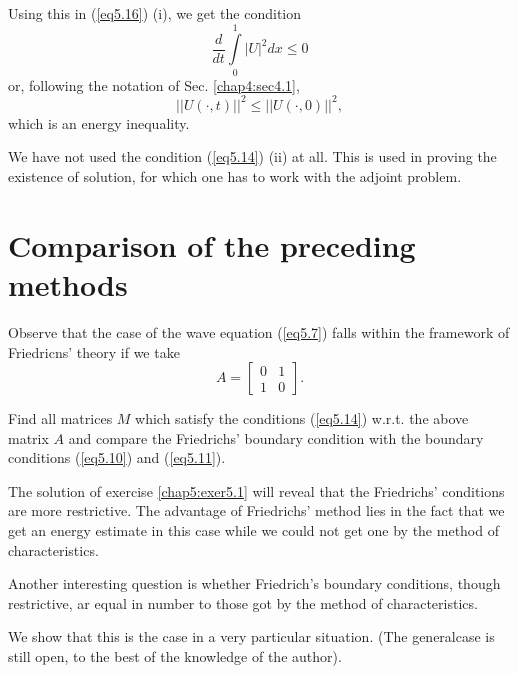 Using this in (\ref{eq5.16}) (i), we get the condition 
$$
\frac{d}{dt} \int\limits^1_0 |U|^2 dx \leq 0
$$\pageoriginale
or, following the notation of Sec. \ref{chap4:sec4.1},
\begin{equation*}
|| U(\cdot, t)||^2 \leq ||U(\cdot, 0)||^2, 
\tag{5.17}\label{eq5.17}
\end{equation*}
which is an energy inequality.

\begin{remark}\label{chap5:rem5.1}
We have not used the condition (\ref{eq5.14}) (ii) at all. This is used in
proving the existence of solution, for which one has to work with the
adjoint problem.
\end{remark}

\section{Comparison of the preceding methods}\label{chap5:sec5.6}

Observe that the case of the wave equation (\ref{eq5.7}) falls within the
framework of Friedricns' theory if we take 
$$
A = \begin{bmatrix} 
0 & 1\\ 
1 & 0
\end{bmatrix}.
$$

\begin{exercise}\label{chap5:exer5.1}
Find all matrices $M$ which satisfy the conditions (\ref{eq5.14}) w.r.t. the
above matrix $A$ and compare the Friedrichs' boundary condition with
the boundary conditions (\ref{eq5.10}) and (\ref{eq5.11}).
\end{exercise}

The solution of exercise \ref{chap5:exer5.1} will reveal that the Friedrichs'
conditions are more restrictive. The advantage of Friedrichs' method
lies in the fact that we get an energy estimate in this case while we
could not get one by the method of characteristics. 

Another interesting question is whether Friedrich's boundary
conditions, though restrictive, ar equal in number to those got by
the method of characteristics.

We show that this is the case in a very particular situation. (The
general\pageoriginale case is still open, to the best of the knowledge
of the author).

